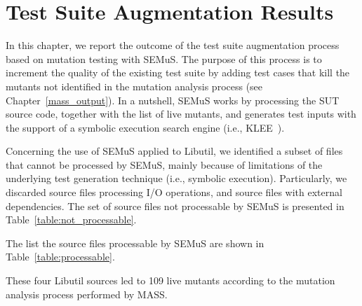 
\chapter{Test Suite Augmentation Results}

In this chapter, we report the outcome of the test suite augmentation process based on mutation testing with SEMuS. The purpose of this process is to increment the quality of the existing test suite by adding test cases that kill the mutants not identified in the mutation analysis process (see Chapter~\ref{mass_output}). 
In a nutshell, SEMuS works by processing the SUT source code, together with the list of live mutants, and generates test inputs with the support of a symbolic execution search engine (i.e., KLEE~\cite{cadar2008klee}).



Concerning the use of SEMuS applied to Libutil, we identified a subset of files that cannot be processed by SEMuS, mainly because of limitations of the underlying test generation technique (i.e., symbolic execution). Particularly, we discarded source files processing I/O operations, and source files with external dependencies. The set of source files not processable by SEMuS is presented in Table~\ref{table:not_processable}.





The list the source files processable by SEMuS are shown in Table~\ref{table:processable}.

These four Libutil sources led to 109 live mutants according to the mutation analysis process performed by MASS.



